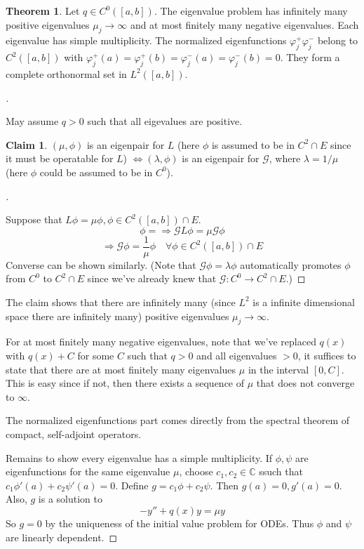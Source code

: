\documentclass{article}
\theoremstyle{definition}
\newtheorem{thm}{Theorem}
\newtheorem*{clm}{Claim}
\newenvironment{proofs}[1][\proofname]{%
  \begin{proof}[#1]$ $\par\nobreak\ignorespaces
}{%
  \end{proof}
}
\newcommand{\CC}{\mathbb C}
\newcommand{\G}{\mathcal G}
\begin{document}
\begin{thm}
	Let $q \in C^0([a, b])$.
	The eigenvalue problem has infinitely many positive eigenvalues $\mu_j \to \infty$ and at most finitely many negative eigenvalues.
	Each eigenvalue has simple multiplicity.
	The normalized eigenfunctions $\varphi_j^+ \varphi_j^-$ belong to $C^2([a, b])$ with $\varphi_j^+(a) = \varphi_j^+(b) = \varphi_j^-(a) = \varphi_j^-(b) = 0$.
	They form a complete orthonormal set in $L^2([a, b])$.
\end{thm}

\begin{proofs}
	May assume $q > 0$ such that all eigevalues are positive.
	\begin{clm}
		$(\mu, \phi)$ is an eigenpair for $L$ (here $\phi$ is assumed to be in $C^2 \cap E$ since it must be operatable for $L$) $\Leftrightarrow (\lambda, \phi)$ is an eigenpair for $\G$, where $\lambda = 1/\mu$ (here $\phi$ could be assumed to be in $C^0$).
	\end{clm}

	\begin{proofs}
		Suppose that $L \phi = \mu \phi, \phi \in C^2([a, b]) \cap E$.
		\[
			\phi = \Rightarrow \G L \phi = \mu \G \phi
		\]
		\[
			\Rightarrow \G \phi = \frac{1}{\mu} \phi \quad \forall \phi \in C^2([a, b]) \cap E
		\]
		Converse can be shown similarly.
		(Note that $\G \phi = \lambda \phi$ automatically promotes $\phi$ from $C^0$ to $C^2 \cap E$ since we've already knew that $\G: C^0 \to C^2 \cap E$.)
	\end{proofs}
	The claim shows that there are infinitely many (since $L^2$ is a infinite dimensional space there are infinitely many) positive eigenvalues $\mu_j \to \infty$.
	\par For at most finitely many negative eigenvalues, note that we've replaced $q(x)$ with $q(x) + C$ for some $C$ such that $q > 0$ and all eigenvalues $> 0$, 
	it suffices to state that there are at most finitely many eigenvalues $\mu$ in the interval $[0, C]$.
	This is easy since if not, then there exists a sequence of $\mu$ that does not converge to $\infty$.
	\par The normalized eigenfunctions part comes directly from the spectral theorem of compact, self-adjoint operators.
	\par Remains to show every eigenvalue has a simple multiplicity.
	If $\phi, \psi$ are eigenfunctions for the same eigenvalue $\mu$, choose $c_1, c_2 \in \CC$ ssuch that $c_1 \phi'(a) + c_2 \psi'(a) = 0$.
	Define $g = c_1 \phi + c_2 \psi$.
	Then $g(a) = 0, g'(a) = 0$.
	Also, $g$ is a solution to 
	\[
		-y'' + q(x) y = \mu y
	\]
	So $g = 0$ by the uniqueness of the initial value problem for ODEs.
	Thus $\phi$ and $\psi$ are linearly dependent.

\end{proofs}
\end{document}
